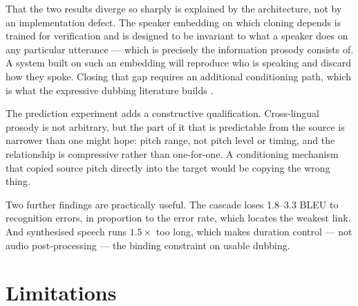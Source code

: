 That the two results diverge so sharply is explained by the architecture, not by an implementation
defect. The speaker embedding on which cloning depends is trained for verification and is designed
to be invariant to what a speaker does on any particular utterance --- which is precisely the
information prosody consists of. A system built on such an embedding will reproduce who is speaking
and discard how they spoke. Closing that gap requires an additional conditioning path, which is
what the expressive dubbing literature builds \cite{swiatkowski2023dubbing,song2023styles2st}.

The prediction experiment adds a constructive qualification. Cross-lingual prosody is not
arbitrary, but the part of it that is predictable from the source is narrower than one might hope:
pitch range, not pitch level or timing, and the relationship is compressive rather than
one-for-one. A conditioning mechanism that copied source pitch directly into the target would be
copying the wrong thing.

Two further findings are practically useful. The cascade loses 1.8--3.3 BLEU to recognition errors,
in proportion to the error rate, which locates the weakest link. And synthesised speech runs
$1.5\times$ too long, which makes duration control --- not audio post-processing --- the binding
constraint on usable dubbing.

\section{Limitations}
\label{sec:limitations}

